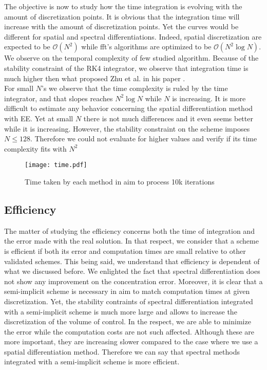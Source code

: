 \documentclass[10pt,a4paper,twocolumn]{article}
\begin{document}
The objective is now to study how the time integration is evolving with the amount of discretization points. It is obvious that the integration time will increase with the amount of discretization points. Yet the curves would be different for spatial and spectral differentiations. Indeed, spatial discretization are expected to be $\mathcal{O}(N^2)$ while fft's algorithms are optimized to be $\mathcal{O}(N^2 \log N)$. We observe on  the temporal complexity of few studied algorithm. Because of the stability constraint of the RK4 integrator, we observe that integration time is much higher then what proposed Zhu et al. in his paper \cite{zhu_1999}.
\vspace{\baselineskip}\\
For small $N$'s we observe that the time complexity is ruled by the time integrator, and that slopes reaches $N^2\log N$ while $N$ is increasing. It is more difficult to estimate any behavior concerning the spatial differentiation method with EE. Yet at small $N$ there is not much differences and it even seems better while it is increasing. However, the stability constraint on the scheme imposes $N\leq128$. Therefore we could not evaluate for higher values and verify if its time complexity fits with $N^2$
\begin{figure}
	\texttt{[image: time.pdf]}
	\caption{Time taken by each method in aim to process 10k iterations}
	\label{fig:temporal_complexity}
\end{figure}

\subsection{Efficiency} %
\label{sub:efficiency}

The matter of studying the efficiency concerns both the time of integration and the error made with the real solution. In that respect, we consider that a scheme is efficient if both its error and computation times are small relative to other validated schemes. This being said, we understand that efficiency is dependent of what we discussed before. We enlighted the fact that spectral differentiation does not show any improvement on the concentration error. Moreover, it is clear that a semi-implicit scheme is necessary in aim to match computation times at given discretization. Yet, the stability contraints of spectral differentiation integrated with a semi-implicit scheme is much more large and allows to increase the discretization of the volume of control. In the respect, we are able to minimize the error while the computation costs are not such affected. Although these are more important, they are increasing slower compared to the case where we use a spatial differentiation method. Therefore we can say that spectral methods integrated with a semi-implicit scheme is more efficient.
\end{document}
